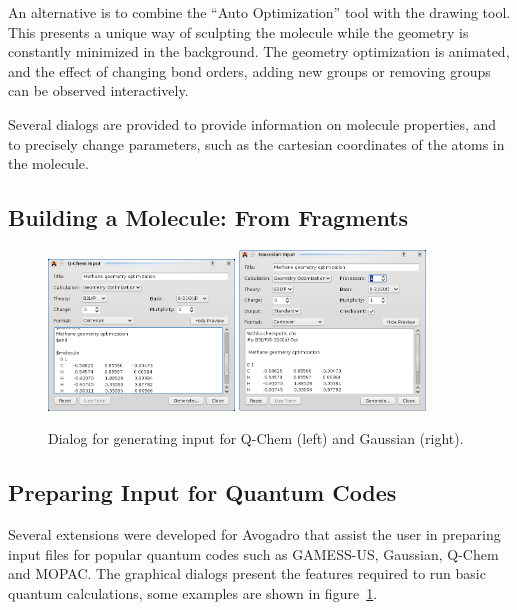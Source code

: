 \documentclass{article}
\begin{document}
An alternative is to combine the ``Auto Optimization'' tool with the drawing tool. This presents a unique way of sculpting the molecule while the geometry is constantly minimized in the background. The geometry optimization is animated, and the effect of changing bond orders, adding new groups or removing groups can be observed interactively.

Several dialogs are provided to provide information on molecule properties, and to precisely change parameters, such as the cartesian coordinates of the atoms in the molecule.

\subsection{Building a Molecule: From Fragments} %

\begin{figure}
	\includegraphics[width=0.44\textwidth]{images/avogadro-q-chem}
	\hspace{0.1cm}
	\includegraphics[width=0.44\textwidth]{images/avogadro-gaussian}
	\caption{Dialog for generating input for Q-Chem (left) and Gaussian (right).}
	\label{f:quantumdialogs}
\end{figure}

\subsection{Preparing Input for Quantum Codes}

Several extensions were developed for Avogadro that assist the user in preparing input files for popular quantum codes such as GAMESS-US, Gaussian, Q-Chem and MOPAC. The graphical dialogs present the features required to run basic quantum calculations, some examples are shown in figure~\ref{f:quantumdialogs}.
\end{document}
